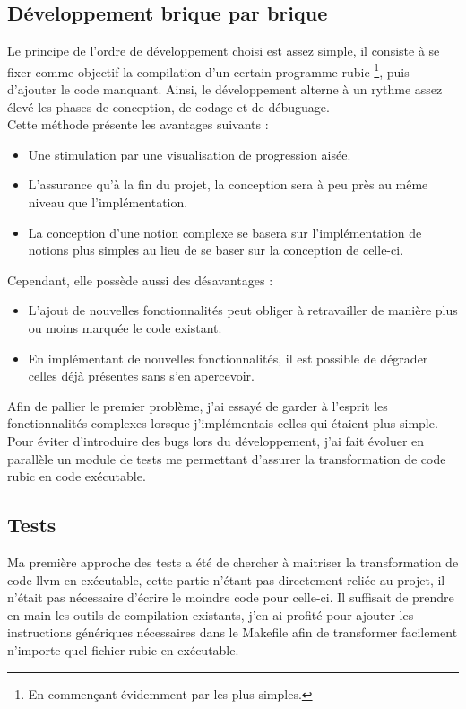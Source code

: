 \documentclass[12pt]{article}
\begin{document}
\subsection{Développement brique par brique}
Le principe de l'ordre de développement choisi est assez simple, il consiste
à se fixer comme objectif la compilation d'un certain programme rubic
\footnote{En commençant évidemment par les plus simples.}, puis d'ajouter le
code manquant. Ainsi, le développement alterne à un rythme assez élevé les
phases de conception, de codage et de débuguage.\\

Cette méthode présente les avantages suivants :
\begin{itemize}
\item Une stimulation par une visualisation de progression aisée.
\item L'assurance qu'à la fin du projet, la conception sera à peu près au
  même niveau que l'implémentation.
\item La conception d'une notion complexe se basera sur l'implémentation de
  notions plus simples au lieu de se baser sur la conception de celle-ci.
\end{itemize}

Cependant, elle possède aussi des désavantages :
\begin{itemize}
\item L'ajout de nouvelles fonctionnalités peut obliger à retravailler de
  manière plus ou moins marquée le code existant.
\item En implémentant de nouvelles fonctionnalités, il est possible de
  dégrader celles déjà présentes sans s'en apercevoir.
\end{itemize}

Afin de pallier le premier problème, j'ai essayé de garder à l'esprit les
fonctionnalités complexes lorsque j'implémentais celles qui étaient plus
simple.\\

Pour éviter d'introduire des bugs lors du développement, j'ai fait évoluer
en parallèle un module de tests me permettant d'assurer la transformation de
code rubic en code exécutable.

\subsection{Tests}

Ma première approche des tests a été de chercher à maitriser la
transformation de code llvm en exécutable, cette partie n'étant pas
directement reliée au projet, il n'était pas nécessaire d'écrire le moindre
code pour celle-ci. Il suffisait de prendre en main les outils de compilation
existants, j'en ai profité pour ajouter les instructions génériques
nécessaires dans le Makefile afin de transformer facilement n'importe quel
fichier rubic en exécutable.\\
\end{document}
